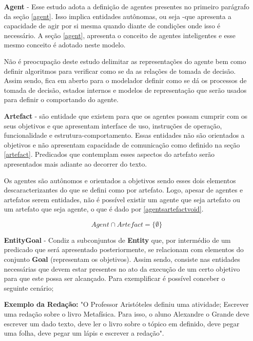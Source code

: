 \textbf{Agent} - Esse estudo adota a definição de agentes presentes no primeiro parágrafo da seção \ref{agent}. Isso implica entidades autônomas, ou seja -que apresenta a capacidade de agir por si mesma quando diante de condições onde isso é necessário. A seção \ref{agent}, apresenta o conceito de agentes inteligentes e esse mesmo conceito é adotado neste modelo. 

Não é preocupação deste estudo delimitar as representações do agente bem como definir algoritmos para verificar como se da as relações de tomada de decisão. Assim sendo, fica em aberto para o modelador definir como se dá os processos de tomada de decisão, estados internos e modelos de representação que serão usados para definir o comportando do agente. 

\textbf{Artefact} - são entidade que existem para que os agentes possam cumprir com os seus objetivos e que apresentam interface de uso, instruções de operação, funcionalidade e estrutura-comportamento. Essas entidades não são orientados a objetivos e 
não apresentam capacidade de comunicação como definido na seção \ref{artefact}. Predicados que contemplam esses aspectos do artefato serão apresentados mais adiante ao decorrer do texto. 

Os agentes são autônomos e orientados a objetivos sendo esses dois elementos descaracterizantes do que se defini como por artefato. Logo, apesar de agentes e artefatos serem entidades, não é possível existir um agente que seja artefato ou um artefato que seja agente, o que é dado por \ref{agentsartefactvoid}. 

\begin{equation} \label{agentsartefactvoid}
    Agent \cap Artefact = \{ \emptyset \}
\end{equation}


\textbf{EntityGoal} - Condiz a subconjuntos de \textbf{Entity} que, por intermédio de um predicado que será apresentado posteriormente, se relacionam com elementos do conjunto \textbf{Goal} (representam os objetivos). Assim sendo, consiste nas entidades necessárias que devem estar presentes no ato da execução de um certo objetivo para que este possa ser alcançado. Para exemplificar é possível conceber o seguinte cenário; 

\textbf{Exemplo da Redação:} "O Professor Aristóteles definiu uma atividade; Escrever uma redação sobre o livro Metafísica. Para isso, o aluno Alexandre o Grande deve escrever um dado texto, deve ler o livro sobre o tópico em definido, deve pegar uma folha, deve pegar um lápis e escrever a redação".  


